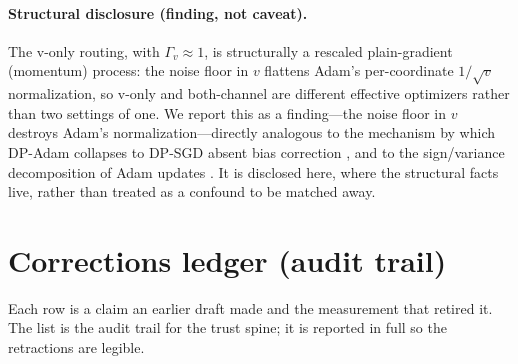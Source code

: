 \documentclass[10pt]{article}
\newcommand{\gam}{\Gamma}
\begin{document}
\paragraph{Structural disclosure (finding, not caveat).}
The v-only routing, with $\gam_v\approx1$, is structurally a rescaled
plain-gradient (momentum) process: the noise floor in $v$ flattens Adam's
per-coordinate $1/\sqrt{v}$ normalization, so v-only and both-channel are
different effective optimizers rather than two settings of one. We report this as
a finding---the noise floor in $v$ destroys Adam's normalization---directly
analogous to the mechanism by which DP-Adam collapses to DP-SGD absent bias
correction \citep{dpadambc,litramer}, and to the sign/variance decomposition of
Adam updates \citep{balleshennig,kunstner}. It is disclosed here, where the
structural facts live, rather than treated as a confound to be matched away.

\section{Corrections ledger (audit trail)}
\label{app:corr}
Each row is a claim an earlier draft made and the measurement that retired it.
The list is the audit trail for the trust spine; it is reported in full so the
retractions are legible.
\end{document}
